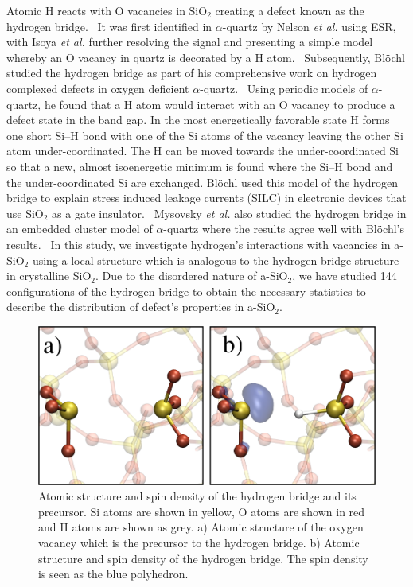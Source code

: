 \documentclass[aps,prb,reprint,superscriptaddress,showpacs]{revtex4-1}
\begin{document}
Atomic H reacts with O vacancies in SiO$_2$ creating a defect known as the hydrogen bridge.~\cite{eprime_4_1,eprime_4_2,blochl_vacancies,mysovsky_pov,VANGINHOVEN06} It was first identified in $\alpha$-quartz by Nelson \emph{et al.} using ESR,~\cite{eprime_4_2} with Isoya \emph{et al.} further resolving the signal and presenting a simple model whereby an O vacancy in quartz is decorated by a H atom.~\cite{eprime_4_1} Subsequently, Bl\"{o}chl studied the hydrogen bridge as part of his comprehensive work on hydrogen complexed defects in oxygen deficient $\alpha$-quartz.~\cite{blochl_vacancies} Using periodic models of $\alpha$-quartz, he found that a H atom would interact with an O vacancy to produce a defect state in the band gap. In the most energetically favorable state H forms one short \mbox{Si--H} bond with one of the Si atoms of the vacancy leaving the other Si atom under-coordinated. The H can be moved towards the under-coordinated Si so that a new, almost isoenergetic minimum is found where the \mbox{Si--H} bond and the under-coordinated Si are exchanged. Bl\"{o}chl used this model of the hydrogen bridge to explain stress induced leakage currents (SILC) in electronic devices that use SiO$_2$ as a gate insulator.~\cite{BLOECHL99} Mysovsky \emph{et al.} also studied the hydrogen bridge in an embedded cluster model of $\alpha$-quartz where the results agree well with Bl\"{o}chl's results.~\cite{mysovsky_pov} In this study, we investigate hydrogen's interactions with vacancies in a-SiO$_2$ using a local structure which is analogous to the hydrogen bridge structure in crystalline SiO$_2$. Due to the disordered nature of a-SiO$_2$, we have studied 144 configurations of the hydrogen bridge to obtain the necessary statistics to describe the distribution of defect's properties in a-SiO$_2$.

\begin{figure}[h!]
\includegraphics{hydrogen_bridge_configurations2.png}
\caption{Atomic structure and spin density of the hydrogen bridge and its precursor. Si atoms are shown in yellow, O atoms are shown in red and H atoms are shown as grey. a) Atomic structure of the oxygen vacancy which is the precursor to the hydrogen bridge. b) Atomic structure and spin density of the hydrogen bridge. The spin density is seen as the blue polyhedron.}
\label{fig:h_bridge}
\end{figure}
\end{document}
